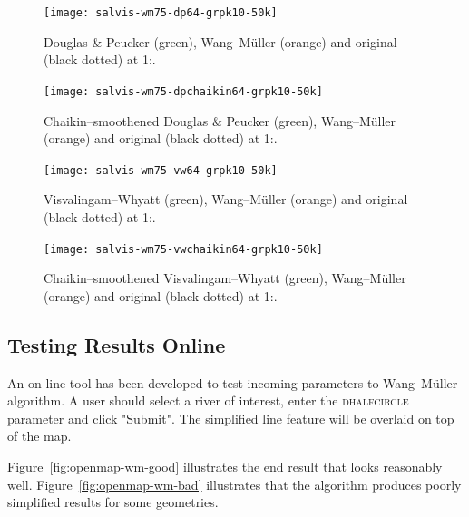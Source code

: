 \documentclass[a4paper]{article}
\newcommand{\DP}{Douglas \& Peucker}
\newcommand{\VW}{Visvalingam--Whyatt}
\newcommand{\WM}{Wang--M{\"u}ller}
\begin{document}
\begin{figure}[h!]
    \texttt{[image: salvis-wm75-dp64-grpk10-50k]}


    \caption{{\DP} (green), {\WM} (orange) and original (black dotted) at
    1:.}

    \label{fig:salvis-wm75-dp64-grpk10-50k}
\end{figure}

\begin{figure}[h!]
    \texttt{[image: salvis-wm75-dpchaikin64-grpk10-50k]}

    \caption{Chaikin--smoothened {\DP} (green), {\WM} (orange) and original
    (black dotted) at 1:.}

    \label{fig:salvis-wm75-dpchaikin64-grpk10-50k}
\end{figure}


\begin{figure}[h!]
    \texttt{[image: salvis-wm75-vw64-grpk10-50k]}

    \caption{{\VW} (green), {\WM} (orange) and original (black dotted) at
    1:.}

    \label{fig:salvis-wm75-vw64-grpk10-50k}
\end{figure}

\begin{figure}[h!]
    \texttt{[image: salvis-wm75-vwchaikin64-grpk10-50k]}

    \caption{Chaikin--smoothened {\VW} (green), {\WM} (orange) and original
    (black dotted) at 1:.}

    \label{fig:salvis-wm75-vwchaikin64-grpk10-50k}
\end{figure}


\subsection{Testing Results Online}
\label{sec:testing-results-online}

An on-line tool\cite{openmapwm} has been developed to test incoming parameters
to {\WM} algorithm. A user should select a river of interest, enter the
\textsc{dhalfcircle} parameter and click "Submit". The simplified line feature
will be overlaid on top of the map.

Figure~\ref{fig:openmap-wm-good} illustrates the end result that looks
reasonably well. Figure~\ref{fig:openmap-wm-bad} illustrates that the algorithm
produces poorly simplified results for some geometries.
\end{document}
